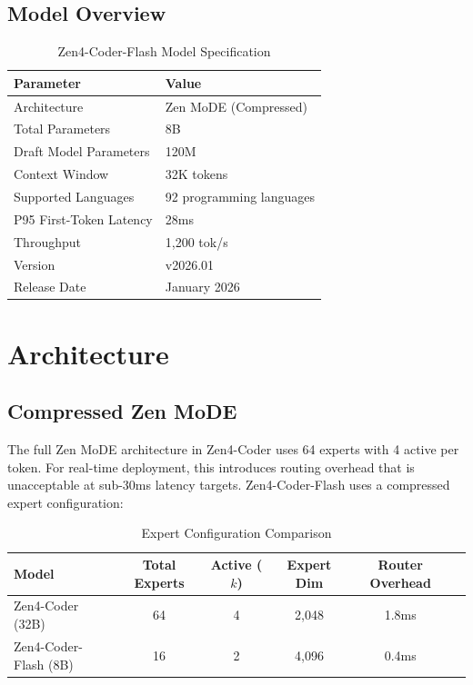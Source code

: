 \documentclass[11pt,a4paper]{article}
\begin{document}
\subsection{Model Overview}

\begin{table}[H]
\centering
\caption{Zen4-Coder-Flash Model Specification}
\begin{tabular}{ll}
\toprule
\textbf{Parameter} & \textbf{Value} \\
\midrule
Architecture & Zen MoDE (Compressed) \\
Total Parameters & 8B \\
Draft Model Parameters & 120M \\
Context Window & 32K tokens \\
Supported Languages & 92 programming languages \\
P95 First-Token Latency & 28ms \\
Throughput & 1,200 tok/s \\
Version & v2026.01 \\
Release Date & January 2026 \\
\bottomrule
\end{tabular}
\end{table}

\section{Architecture}

\subsection{Compressed Zen MoDE}

The full Zen MoDE architecture in Zen4-Coder uses 64 experts with 4 active per token. For real-time deployment, this introduces routing overhead that is unacceptable at sub-30ms latency targets. Zen4-Coder-Flash uses a compressed expert configuration:

\begin{table}[H]
\centering
\caption{Expert Configuration Comparison}
\begin{tabular}{lccccc}
\toprule
\textbf{Model} & \textbf{Total Experts} & \textbf{Active ($k$)} & \textbf{Expert Dim} & \textbf{Router Overhead} \\
\midrule
Zen4-Coder (32B) & 64 & 4 & 2,048 & 1.8ms \\
Zen4-Coder-Flash (8B) & 16 & 2 & 4,096 & 0.4ms \\
\bottomrule
\end{tabular}
\end{table}
\end{document}
